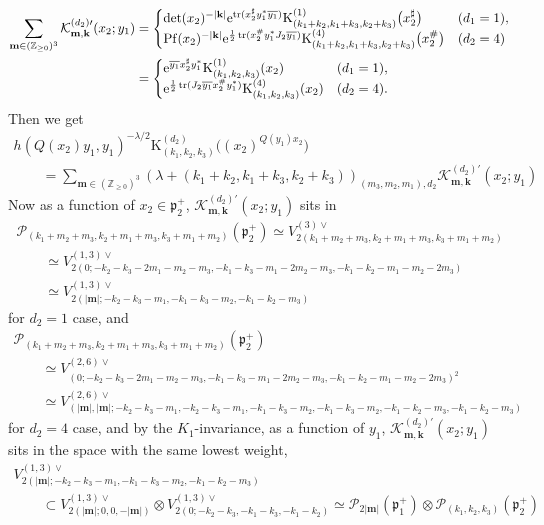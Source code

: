 \documentclass[pdftex]{sigma}
\numberwithin{equation}{section}
\newcommand{\bk}{\mathbf{k}}
\newcommand{\bm}{\mathbf{m}}
\newcommand{\BZ}{\mathbb{Z}}
\newcommand{\fp}{\mathfrak{p}}
\newcommand{\cK}{\mathcal{K}}
\newcommand{\cP}{\mathcal{P}}
\newcommand{\rK}{\mathrm{K}}
\newcommand{\tr}{\operatorname{tr}}
\newcommand{\Pf}{\operatorname{Pf}}
\begin{document}
\begin{align*}
\sum_{\bm\in(\BZ_{\ge 0})^3}\cK_{\bm,\bk}^{(d_2)\prime}(x_2;y_1)
&=\begin{cases}\det(x_2)^{-|\bk|}{\rm e}^{\tr(x_2^\sharp y_1^*\overline{y_1})}\rK_{(k_1+k_2,k_1+k_3,k_2+k_3)}^{(1)}\big(x_2^\sharp\big) & (d_1=1), \\
\Pf(x_2)^{-|\bk|}{\rm e}^{\frac{1}{2}\tr(x_2^\#y_1^*J_2\overline{y_1})}\rK_{(k_1+k_2,k_1+k_3,k_2+k_3)}^{(4)}\big(x_2^\#\big) & (d_2=4) \end{cases} \\
&=\begin{cases}{\rm e}^{\overline{y_1}x_2^\sharp y_1^*}\rK_{(k_1,k_2,k_3)}^{(1)}(x_2) & (d_1=1), \\
{\rm e}^{\frac{1}{2}\tr(J_2\overline{y_1}x_2^\#y_1^*)}\rK_{(k_1,k_2,k_3)}^{(4)}(x_2) & (d_2=4). \end{cases}
\end{align*}
Then we get
\begin{gather*}
 h(Q(x_2)y_1,y_1)^{-\lambda/2}\rK_{(k_1,k_2,k_3)}^{(d_2)}\big((x_2)^{Q(y_1)x_2}\big) \\
\qquad{} =\sum_{\bm\in(\BZ_{\ge 0})^3}(\lambda+(k_1+k_2,k_1+k_3,k_2+k_3))_{(m_3,m_2,m_1),d_2}\cK_{\bm,\bk}^{(d_2)\prime}(x_2;y_1)
\end{gather*}
Now as a function of $x_2\in\fp^+_2$, $\cK_{\bm,\bk}^{(d_2)\prime}(x_2;y_1)$ sits in
\begin{gather*}
 \cP_{(k_1+m_2+m_3,k_2+m_1+m_3,k_3+m_1+m_2)}(\fp^+_2)
\simeq V_{2(k_1+m_2+m_3,k_2+m_1+m_3,k_3+m_1+m_2)}^{(3)\vee} \\
\qquad{} \simeq V_{2(0;-k_2-k_3-2m_1-m_2-m_3,-k_1-k_3-m_1-2m_2-m_3,-k_1-k_2-m_1-m_2-2m_3)}^{(1,3)\vee} \\
\qquad{} \simeq V_{2(|\bm|;-k_2-k_3-m_1,-k_1-k_3-m_2,-k_1-k_2-m_3)}^{(1,3)\vee}
\end{gather*}
for $d_2=1$ case, and
\begin{gather*}
 \cP_{(k_1+m_2+m_3,k_2+m_1+m_3,k_3+m_1+m_2)}(\fp^+_2)\\
\qquad{} \simeq V_{(0;-k_2-k_3-2m_1-m_2-m_3,-k_1-k_3-m_1-2m_2-m_3,-k_1-k_2-m_1-m_2-2m_3)^2}^{(2,6)\vee}\\
\qquad{} \simeq V_{(|\bm|,|\bm|;-k_2-k_3-m_1,-k_2-k_3-m_1,-k_1-k_3-m_2,-k_1-k_3-m_2,-k_1-k_2-m_3,-k_1-k_2-m_3)}^{(2,6)\vee}
\end{gather*}
for $d_2=4$ case, and by the $K_1$-invariance, as a function of $y_1$, $\cK_{\bm,\bk}^{(d_2)\prime}(x_2;y_1)$ sits in the space with the same lowest weight,
\begin{gather*}
 V_{2(|\bm|;-k_2-k_3-m_1,-k_1-k_3-m_2,-k_1-k_2-m_3)}^{(1,3)\vee} \\
\qquad{} \subset V_{2(|\bm|;0,0,-|\bm|)}^{(1,3)\vee}\otimes V_{2(0;-k_2-k_3,-k_1-k_3,-k_1-k_2)}^{(1,3)\vee}
\simeq \cP_{2|\bm|}(\fp^+_1)\otimes\cP_{(k_1,k_2,k_3)}(\fp^+_2)
\end{gather*}
\end{document}
